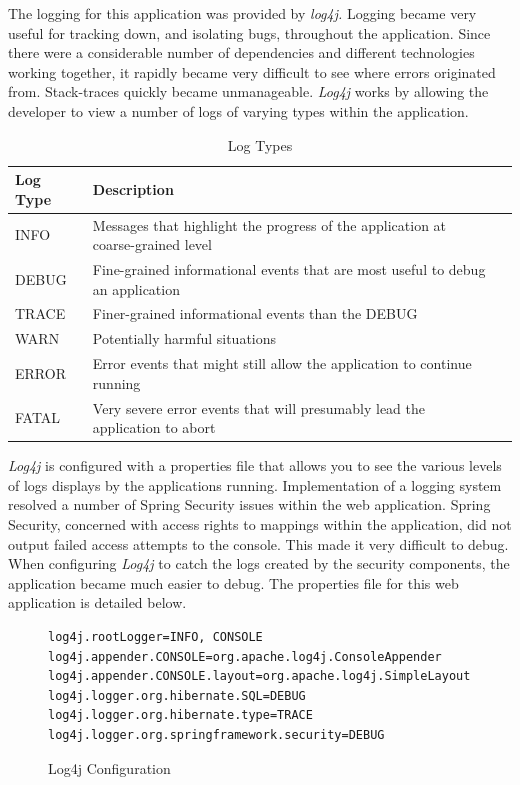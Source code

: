 The logging for this application was provided by \textit{log4j.} Logging became very useful for tracking down, and isolating bugs, throughout the application. Since there were a considerable number of dependencies and different technologies working together, it rapidly became very difficult to see where errors originated from. Stack-traces quickly became unmanageable. \textit{Log4j} works by allowing the developer to view a number of logs of varying types within the application.
\begin{table}[H]
\caption{Log Types}
\begin{center}
    \begin{tabular}{ | l | l | p{5cm} |}
    \hline
    Log Type & Description \\ \hline
    INFO & Messages that highlight the progress of the application at coarse-grained level  \\ \hline
    DEBUG & Fine-grained informational events that are most useful to debug an application\\ \hline
	TRACE & Finer-grained informational events than the DEBUG\\ \hline
	WARN & Potentially harmful situations\\ \hline
	ERROR & Error events that might still allow the application to continue running\\ \hline
    FATAL & Very severe error events that will presumably lead the application to abort\\ \hline
    \end{tabular}
\end{center}

\end{table}

\textit{Log4j} is configured with a properties file that allows you to see the various levels of logs displays by the applications running. Implementation of a logging system resolved a number of Spring Security issues within the web application. Spring Security, concerned with access rights to mappings within the application, did not output failed access attempts to the console. This made it very difficult to debug. When configuring \textit{Log4j} to catch the logs created by the security components, the application became much easier to debug. The properties file for this web application is detailed below.

\begin{figure}[H]
\begin{lstlisting}
log4j.rootLogger=INFO, CONSOLE
log4j.appender.CONSOLE=org.apache.log4j.ConsoleAppender
log4j.appender.CONSOLE.layout=org.apache.log4j.SimpleLayout
log4j.logger.org.hibernate.SQL=DEBUG
log4j.logger.org.hibernate.type=TRACE
log4j.logger.org.springframework.security=DEBUG
\end{lstlisting}
\caption{Log4j Configuration}
\end{figure}

